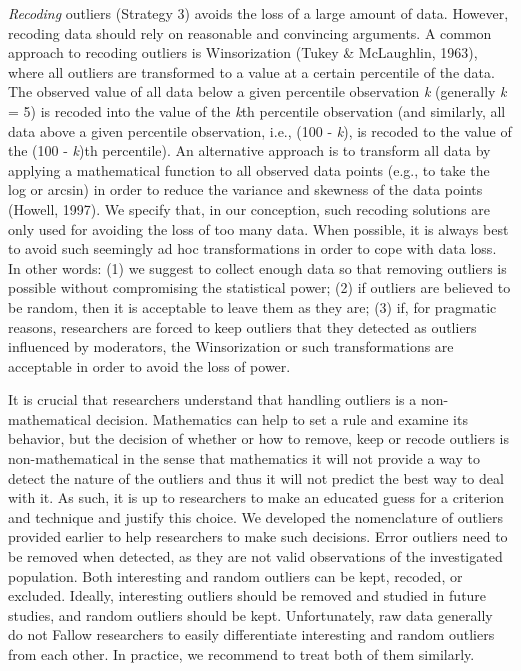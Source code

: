 \documentclass[man,floatsintext]{apa6}
\begin{document}
\emph{Recoding} outliers (Strategy 3) avoids the loss of a large amount of data. However, recoding data should rely on reasonable and convincing arguments. A common approach to recoding outliers is Winsorization (Tukey \& McLaughlin, 1963), where all outliers are transformed to a value at a certain percentile of the data. The observed value of all data below a given percentile observation \emph{k} (generally \emph{k} = 5) is recoded into the value of the \emph{k}th percentile observation (and similarly, all data above a given percentile observation, i.e., (100 - \emph{k}), is recoded to the value of the (100 - \emph{k})th percentile). An alternative approach is to transform all data by applying a mathematical function to all observed data points (e.g., to take the log or arcsin) in order to reduce the variance and skewness of the data points (Howell, 1997). We specify that, in our conception, such recoding solutions are only used for avoiding the loss of too many data. When possible, it is always best to avoid such seemingly ad hoc transformations in order to cope with data loss. In other words: (1) we suggest to collect enough data so that removing outliers is possible without compromising the statistical power; (2) if outliers are believed to be random, then it is acceptable to leave them as they are; (3) if, for pragmatic reasons, researchers are forced to keep outliers that they detected as outliers influenced by moderators, the Winsorization or such transformations are acceptable in order to avoid the loss of power.

It is crucial that researchers understand that handling outliers is a non-mathematical decision. Mathematics can help to set a rule and examine its behavior, but the decision of whether or how to remove, keep or recode outliers is non-mathematical in the sense that mathematics it will not provide a way to detect the nature of the outliers and thus it will not predict the best way to deal with it. As such, it is up to researchers to make an educated guess for a criterion and technique and justify this choice. We developed the nomenclature of outliers provided earlier to help researchers to make such decisions. Error outliers need to be removed when detected, as they are not valid observations of the investigated population. Both interesting and random outliers can be kept, recoded, or excluded. Ideally, interesting outliers should be removed and studied in future studies, and random outliers should be kept. Unfortunately, raw data generally do not Fallow researchers to easily differentiate interesting and random outliers from each other. In practice, we recommend to treat both of them similarly.
\end{document}
